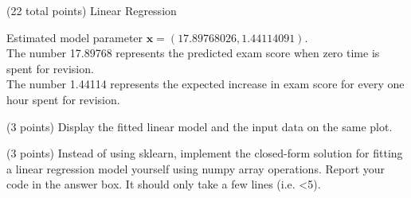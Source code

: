 \documentclass[12pt]{article}
\begin{document}
\begin{question}{(22 total points) Linear Regression}
\begin{subquestion}
\begin{answerbox}{10em}
Estimated model parameter  $\mathbf{x}=(17.89768026,1.44114091)$.
\\The number 17.89768 represents the predicted exam score when zero time is spent for revision.
\\The number 1.44114 represents the expected increase in exam score for every one hour spent for revision.

\end{answerbox}



\end{subquestion}



%
%
\begin{subquestion}{(3 points) Display the fitted linear model and the input data on the same plot.}



\end{subquestion}



%
%
\begin{subquestion}{(3 points) Instead of using sklearn, implement the closed-form solution for fitting a linear regression model yourself using numpy array operations.  
Report your code in the answer box.
It should only take a few lines (i.e. <5).\\ 
}


\begin{answerbox}{20em}


\end{answerbox}
\end{subquestion}
\end{question}
\end{document}
